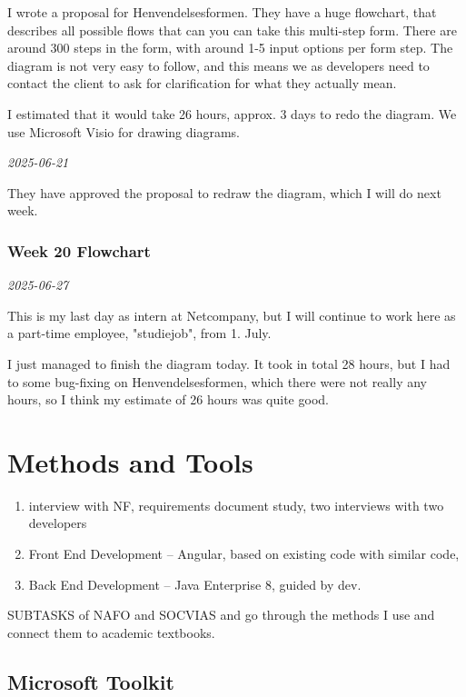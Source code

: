 \documentclass[../main.tex]{subfiles}
\begin{document}
I wrote a proposal for Henvendelsesformen. They have a huge flowchart, that describes all possible flows that can you can take this multi-step form. There are around 300 steps in the form, with around 1-5 input options per form step. The diagram is not very easy to follow, and this means we as developers need to contact the client to ask for clarification for what they actually mean. 

I estimated that it would take 26 hours, approx. 3 days to redo the diagram. We use Microsoft Visio for drawing diagrams.

\textit{2025-06-21}

They have approved the proposal to redraw the diagram, which I will do next week.

\subsubsection{Week 20 Flowchart}

\textit{2025-06-27}

This is my last day as intern at Netcompany, but I will continue to work here as a part-time employee, "studiejob", from 1. July. 

I just managed to finish the diagram today. It took in total 28 hours, but I had to some bug-fixing on Henvendelsesformen, which there were not really any hours, so I think my estimate of 26 hours was quite good. 

\section{Methods and Tools}

\begin{enumerate}
\item interview with NF, requirements document study, two interviews with two developers 
\item Front End Development – Angular, based on existing code with similar code,  
\item Back End Development – Java Enterprise 8, guided by dev. 
\end{enumerate}

SUBTASKS of NAFO and SOCVIAS and go through the methods I use and connect them to academic textbooks.  


\subsection{Microsoft Toolkit}
\end{document}
